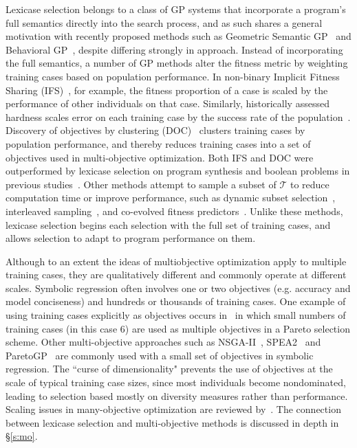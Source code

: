 \documentclass[twoside]{article}
\begin{document}
Lexicase selection belongs to a class of GP systems that incorporate a program's full semantics directly into the search process, and as such shares a general motivation with recently proposed methods such as Geometric Semantic GP~\citep{moraglio_geometric_2012} and Behavioral GP~\citep{krawiec_behavioral_2014}, despite differing strongly in approach. Instead of incorporating the full semantics, a number of GP methods alter the fitness metric by weighting training cases based on population performance. In non-binary Implicit Fitness Sharing (IFS)~\citep{krawiec_implicit_2013}, for example, the fitness proportion of a case is scaled by the performance of other individuals on that case. Similarly, historically assessed hardness scales error on each training case by the success rate of the population~\citep{klein_genetic_2008}. Discovery of objectives by clustering (DOC)~\citep{krawiec_automatic_2015} clusters training cases by population performance, and thereby reduces training cases into a set of objectives used in multi-objective optimization. Both IFS and DOC were outperformed by lexicase selection on program synthesis and boolean problems in previous studies~\citep{helmuth_general_2015-1,liskowski_comparison_2015}. Other methods attempt to sample a subset of $\mathcal{T}$ to reduce computation time or improve performance, such as dynamic subset selection~\citep{gathercole_dynamic_1994}, interleaved sampling~\citep{goncalves_balancing_2013}, and co-evolved fitness predictors~\citep{schmidt_coevolution_2008}. Unlike these methods, lexicase selection begins each selection with the full set of training cases, and allows selection to adapt to program performance on them.

Although to an extent the ideas of multiobjective optimization apply to multiple training cases, they are qualitatively different and commonly operate at different scales. Symbolic regression often involves one or two objectives (e.g. accuracy and model conciseness) and hundreds or thousands of training cases. One example of using training cases explicitly as objectives occurs in~\cite{langdon_evolving_1995} in which small numbers of training cases (in this case 6) are used as multiple objectives in a Pareto selection scheme. Other multi-objective approaches such as NSGA-II~\citep{schoenauer_fast_2000}, SPEA2~\citep{zitzler_spea2:_2001} and ParetoGP~\citep{smits_pareto-front_2005} are commonly used with a small set of objectives in symbolic regression. The ``curse of dimensionality" prevents the use of objectives at the scale of typical training case sizes, since most individuals become nondominated, leading to selection based mostly on diversity measures rather than performance. Scaling issues in many-objective optimization are reviewed by~\cite{ishibuchi_evolutionary_2008}. The connection between lexicase selection and multi-objective methods is discussed in depth in \S\ref{s:mo}.
 
\end{document}
